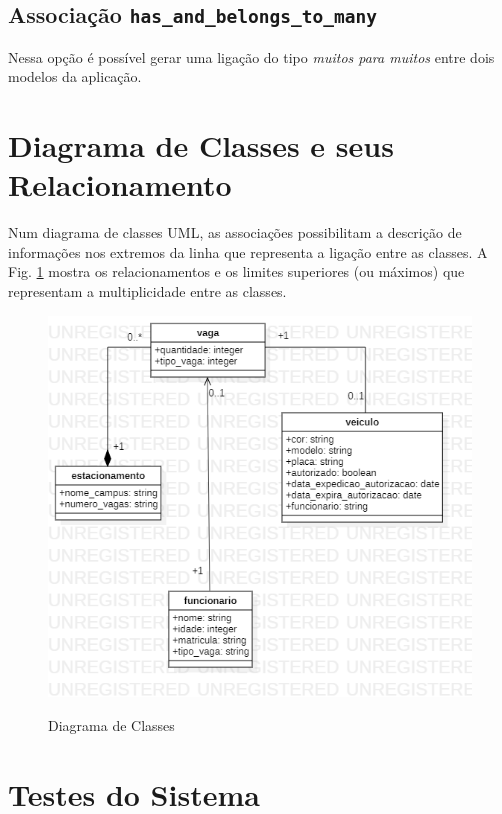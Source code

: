 \subsection{Associação \texttt{has\_and\_belongs\_to\_many}}
Nessa opção é possível gerar uma ligação do tipo \textit{muitos para muitos} entre dois modelos da aplicação.
\section{Diagrama de Classes e seus Relacionamento}
Num diagrama de classes UML, as associações possibilitam a descrição de informações  nos extremos da linha que representa a ligação entre as classes. A Fig. \ref{figura:estacionamentoIfrn}
mostra os relacionamentos e os limites superiores (ou máximos) que representam a multiplicidade entre as classes.

\begin{figure}[h]
	\caption{Diagrama de Classes}
	\centering %
	\includegraphics[scale=0.7]{Figs/estacionamentoIfrn_1.png} %
	\label{figura:estacionamentoIfrn}
\end{figure}


 \section{Testes do Sistema}
 \label{testesSoft}
 

